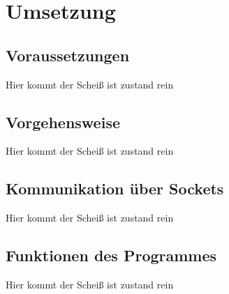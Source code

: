 
\chapter{Umsetzung}


\section{Voraussetzungen}
Hier kommt der Scheiß ist zustand rein

\section{Vorgehensweise}
Hier kommt der Scheiß ist zustand rein

\section{Kommunikation über Sockets}
Hier kommt der Scheiß ist zustand rein

\section{Funktionen des Programmes}
Hier kommt der Scheiß ist zustand rein

